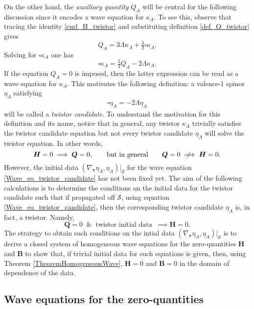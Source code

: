 \documentclass[10pt,a4paper]{article}
\theoremstyle{plain}
\def\bmB{{\bm B}}
\def\bmH{{\bm H}}
\def\bmQ{{\bm Q}}
\newcommand{\notimplies}{%
  \mathrel{{\ooalign{\hidewidth$\not\phantom{=}$\hidewidth\cr$\implies$}}}}
\begin{document}
  On the other hand, the \emph{auxiliary quantity}
  $Q_A$ will be central for the following discussion since it
  encodes a wave equation for $\kappa_A$. To see this, observe that
  tracing the identity \eqref{curl_H_twistor} and substituting 
  definition \eqref{def_Q_twistor} gives
\begin{equation}\label{Q_to_box_twistor_candidate}
Q_{A} = 3 \Lambda \kappa _{A} + \tfrac{3}{2} \square \kappa _{A}.
\end{equation}
Solving for $\square \kappa _{A}$ one has
\[
\square \kappa _{A} = \tfrac{2}{3} Q_{A} -2 \Lambda \kappa _{A}.
\]
If the equation $Q_{A}=0$ is imposed, then
the latter expression can be read as a wave equation for $\kappa_A$.
This motivates the following definition: a valence-1 spinor $\eta_A$ satisfying
\begin{align} \label{Wave_eq_twistor_candidate}
\square \eta _{A} = -2 \Lambda  \eta _{A}
\end{align}
will be called a \emph{twistor candidate}. To understand the
motivation for this definition and its name, notice that in general,
any twistor $\kappa_A$ trivially satisfies the twistor candidate
equation but not every twistor candidate $\eta_A$ will solve the
twistor equation. In other words,
\[
\bmH=0 \implies \bmQ =0, \qquad \text{but in general} \qquad \bmQ =0 \notimplies \bmH=0.
\]
However,  the initial data $(\nabla_{\bm\tau}
\eta_A, \eta_A)|_{\mathcal{S}}$ for the wave equation
\eqref{Wave_eq_twistor_candidate} has not been fixed yet. The aim of the following
calculations is to determine the conditions on the initial data for the
twistor candidate such that if propagated off $\mathcal{S}$, using
equation \eqref{Wave_eq_twistor_candidate}, then the corresponding twistor
candidate $\eta_A$ is, in fact, a twistor. Namely,
\begin{equation}
\bmQ =0 \;\;\&\;\; \text{twistor initial data} \;\;\implies \bmH=0.
\end{equation}
The strategy to obtain such conditions on the intial data
$(\nabla_{\bm\tau} \eta_A, \eta_A)|_{\mathcal{S}}$  is to derive a closed
system of homogeneous wave equations for the zero-quantities $\bmH$
and $\bmB$ to show that, if trivial initial data for such
equations is given, then, using Theorem \ref{TheoremHomogeneousWave},
$\bmH=0$ and $\bmB=0$ in the domain of dependence of the data.

\subsection{Wave equations for the zero-quantities}
\end{document}
